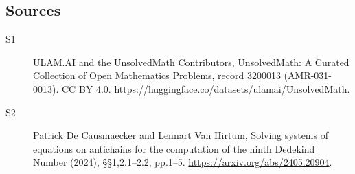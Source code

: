 \documentclass[11pt]{article}
\begin{document}
\subsection{Sources}
\begin{description}
\item[\hypertarget{source:3200013:1}{S1}] ULAM.AI and the UnsolvedMath Contributors, UnsolvedMath: A Curated Collection of Open Mathematics Problems, record 3200013 (AMR-031-0013). CC BY 4.0. \url{https://huggingface.co/datasets/ulamai/UnsolvedMath}.
\item[\hypertarget{source:3200013:2}{S2}] Patrick De Causmaecker and Lennart Van Hirtum, Solving systems of equations on antichains for the computation of the ninth Dedekind Number (2024), §§1,2.1–2.2, pp.1–5. \url{https://arxiv.org/abs/2405.20904}.
\end{description}
\label{end:3200013}
\end{document}
